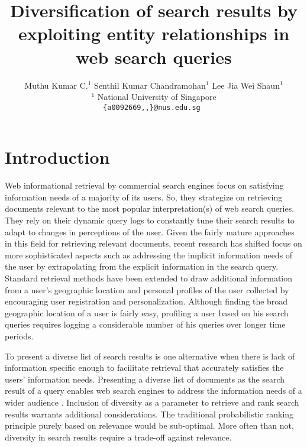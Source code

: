 \documentclass[11pt]{article}
\title{Diversification of search results by exploiting entity relationships in
web search queries}
\author{Muthu Kumar C.$^{1}$ \hspace{1.1cm}  Senthil Kumar Chandramohan$^{1}$ \hspace{1.1cm} Lee Jia Wei Shaun$^{1}$ \\
 {$^{1}$ National University of Singapore }\\
 {\tt \{a0092669,,\}@nus.edu.sg }%
 }
\date{}
\begin{document}
\maketitle
\begin{abstract}
 
\end{abstract}


\section{Introduction}
\label{intro}
Web informational retrieval by commercial search engines focus on 
satisfying information needs of a majority of its users. So, they 
strategize on retrieving documents relevant to the most popular interpretation(s) 
of web search queries. They rely on their dynamic query logs to constantly tune 
their search results to adapt to changes in perceptions of the user. Given 
the fairly mature approaches in this field for retrieving relevant documents, 
recent research has shifted focus on more sophisticated aspects such as addressing 
the implicit information needs of the user by extrapolating from the explicit 
information in the search query. Standard retrieval methods have been extended to 
draw additional information from a user's geographic location \cite{lu2010personalize} 
and personal profiles of the user \cite{teevan2005personalizing} collected by 
encouraging user registration and personalization. Although finding the broad 
geographic location of a user is fairly easy, profiling a user based on his search 
queries requires logging a considerable number of his queries over longer time periods.

To present a diverse list of search results is one alternative when there is lack 
of information specific enough to facilitate retrieval that accurately satisfies the 
users' information needs. Presenting a diverse list of documents as the search result 
of a query enables web search engines to address the information needs of a wider 
audience \cite{bhatia2012analysis}. Inclusion of diversity as a parameter to retrieve 
and rank search results warrants additional considerations. The traditional probabilistic 
ranking principle purely based on relevance would be sub-optimal\cite{gollapudi2009axiomatic}. 
More often than not, diversity in search results require a trade-off against relevance.
\end{document}
